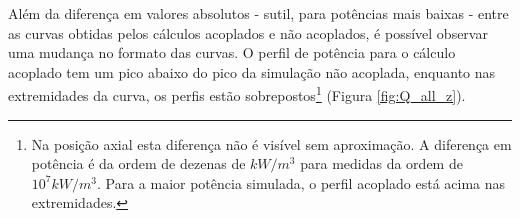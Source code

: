 Além da diferença em valores absolutos - sutil, para potências mais baixas - entre as curvas obtidas pelos
cálculos acoplados e não acoplados, é possível observar uma mudança no formato das curvas. O perfil de
potência para o cálculo acoplado tem um pico abaixo do pico da simulação
não acoplada, enquanto nas extremidades da curva, os perfis estão sobrepostos\footnote{Na posição
  axial esta diferença não é visível sem aproximação. A diferença em potência é da ordem de dezenas de $kW/m^3$ para medidas da
  ordem de $10^7 kW/m^3$. Para a maior potência simulada, o perfil acoplado está acima nas extremidades.} (Figura \ref{fig:Q_all_z}).


